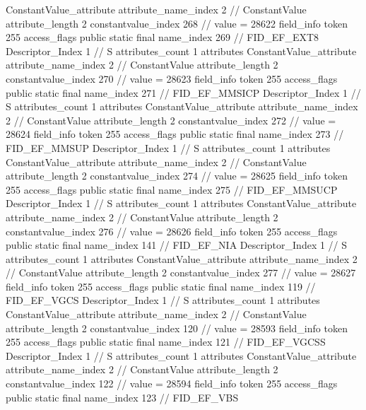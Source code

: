 {{{{{{				ConstantValue_attribute {
					attribute_name_index	2		// ConstantValue
					attribute_length	2
					constantvalue_index	268		// value = 28622
				}
				}
			}
			field_info {
				token	255
				access_flags	public static final
				name_index	269		// FID_EF_EXT8
				Descriptor_Index	1		// S
				attributes_count	1
				attributes {
				ConstantValue_attribute {
					attribute_name_index	2		// ConstantValue
					attribute_length	2
					constantvalue_index	270		// value = 28623
				}
				}
			}
			field_info {
				token	255
				access_flags	public static final
				name_index	271		// FID_EF_MMSICP
				Descriptor_Index	1		// S
				attributes_count	1
				attributes {
				ConstantValue_attribute {
					attribute_name_index	2		// ConstantValue
					attribute_length	2
					constantvalue_index	272		// value = 28624
				}
				}
			}
			field_info {
				token	255
				access_flags	public static final
				name_index	273		// FID_EF_MMSUP
				Descriptor_Index	1		// S
				attributes_count	1
				attributes {
				ConstantValue_attribute {
					attribute_name_index	2		// ConstantValue
					attribute_length	2
					constantvalue_index	274		// value = 28625
				}
				}
			}
			field_info {
				token	255
				access_flags	public static final
				name_index	275		// FID_EF_MMSUCP
				Descriptor_Index	1		// S
				attributes_count	1
				attributes {
				ConstantValue_attribute {
					attribute_name_index	2		// ConstantValue
					attribute_length	2
					constantvalue_index	276		// value = 28626
				}
				}
			}
			field_info {
				token	255
				access_flags	public static final
				name_index	141		// FID_EF_NIA
				Descriptor_Index	1		// S
				attributes_count	1
				attributes {
				ConstantValue_attribute {
					attribute_name_index	2		// ConstantValue
					attribute_length	2
					constantvalue_index	277		// value = 28627
				}
				}
			}
			field_info {
				token	255
				access_flags	public static final
				name_index	119		// FID_EF_VGCS
				Descriptor_Index	1		// S
				attributes_count	1
				attributes {
				ConstantValue_attribute {
					attribute_name_index	2		// ConstantValue
					attribute_length	2
					constantvalue_index	120		// value = 28593
				}
				}
			}
			field_info {
				token	255
				access_flags	public static final
				name_index	121		// FID_EF_VGCSS
				Descriptor_Index	1		// S
				attributes_count	1
				attributes {
				ConstantValue_attribute {
					attribute_name_index	2		// ConstantValue
					attribute_length	2
					constantvalue_index	122		// value = 28594
				}
				}
			}
			field_info {
				token	255
				access_flags	public static final
				name_index	123		// FID_EF_VBS
}}}}}
